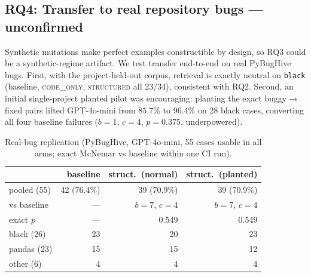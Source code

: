 \documentclass[10pt,conference]{IEEEtran}
\newcommand{\structured}{\textsc{structured}\xspace}
\newcommand{\codeonly}{\textsc{code\_only}\xspace}
\begin{document}
\subsection{RQ4: Transfer to real repository bugs --- unconfirmed}
\label{sec:results-transfer}

Synthetic mutations make perfect examples constructible by design, so RQ3
could be a synthetic-regime artifact. We test transfer end-to-end on real
PyBugHive bugs. First, with the project-held-out corpus, retrieval is
exactly neutral on \texttt{black} (baseline, \codeonly, \structured all
23/34), consistent with RQ2. Second, an initial single-project planted
pilot was encouraging: planting the exact buggy$\to$fixed pairs lifted
GPT-4o-mini from $85.7\%$ to $96.4\%$ on 28 black cases, converting all
four baseline failures ($b{=}1$, $c{=}4$, $p{=}0.375$, underpowered).

\begin{table}[!t]
\caption{Real-bug replication (PyBugHive, GPT-4o-mini, 55 cases usable in
all arms; exact McNemar vs baseline within one CI run).}
\label{tab:powered}
\centering
\footnotesize
\begin{tabular}{@{}lrrr@{}}
\toprule
 & baseline & struct.\ (normal) & struct.\ (planted) \\
\midrule
pooled (55) & 42 (76.4\%) & 39 (70.9\%) & 39 (70.9\%) \\
\quad vs baseline & --- & $b{=}7$, $c{=}4$ & $b{=}7$, $c{=}4$ \\
\quad exact $p$ & --- & 0.549 & 0.549 \\
\midrule
black (26) & 23 & 20 & 23 \\
pandas (23) & 15 & 15 & 12 \\
other (6) & 4 & 4 & 4 \\
\bottomrule
\end{tabular}
\end{table}
\end{document}
